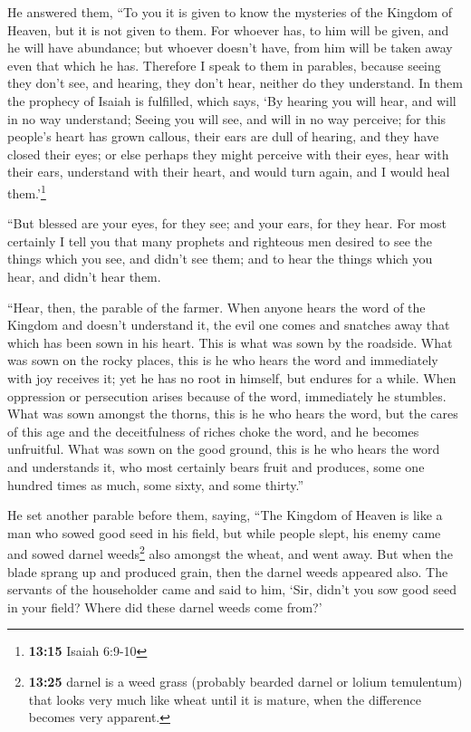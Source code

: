  He answered them, ``To you it is given to know the
mysteries of the Kingdom of Heaven, but it is not given to them.
 For whoever has, to him will be given, and he will have
abundance; but whoever doesn't have, from him will be taken away even
that which he has.  Therefore I speak to them in
parables, because seeing they don't see, and hearing, they don't hear,
neither do they understand.  In them the prophecy of
Isaiah is fulfilled, which says, `By hearing you will hear, and will in
no way understand; Seeing you will see, and will in no way perceive;
 for this people's heart has grown callous, their ears
are dull of hearing, and they have closed their eyes; or else perhaps
they might perceive with their eyes, hear with their ears, understand
with their heart, and would turn again, and I would heal
them.'\footnote{\textbf{13:15} Isaiah 6:9-10}

 ``But blessed are your eyes, for they see; and your
ears, for they hear.  For most certainly I tell you that
many prophets and righteous men desired to see the things which you see,
and didn't see them; and to hear the things which you hear, and didn't
hear them.

 ``Hear, then, the parable of the farmer. 
When anyone hears the word of the Kingdom and doesn't understand it, the
evil one comes and snatches away that which has been sown in his heart.
This is what was sown by the roadside.  What was sown on
the rocky places, this is he who hears the word and immediately with joy
receives it;  yet he has no root in himself, but endures
for a while. When oppression or persecution arises because of the word,
immediately he stumbles.  What was sown amongst the
thorns, this is he who hears the word, but the cares of this age and the
deceitfulness of riches choke the word, and he becomes unfruitful.
 What was sown on the good ground, this is he who hears
the word and understands it, who most certainly bears fruit and
produces, some one hundred times as much, some sixty, and some thirty.''

 He set another parable before them, saying, ``The
Kingdom of Heaven is like a man who sowed good seed in his field,
 but while people slept, his enemy came and sowed darnel
weeds\footnote{\textbf{13:25} darnel is a weed grass (probably bearded
  darnel or lolium temulentum) that looks very much like wheat until it
  is mature, when the difference becomes very apparent.} also amongst
the wheat, and went away.  But when the blade sprang up
and produced grain, then the darnel weeds appeared also. 
The servants of the householder came and said to him, `Sir, didn't you
sow good seed in your field? Where did these darnel weeds come from?'

